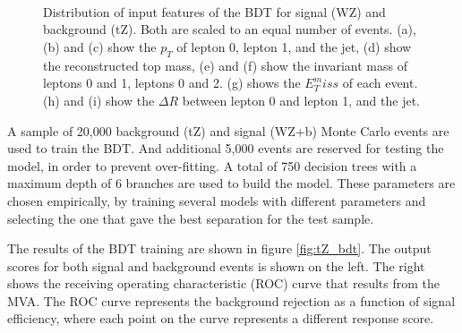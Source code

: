 \begin{figure}[H]
\center
    \\
    \\
    \\                          
    
    \caption{Distribution of input features of the BDT for signal (WZ) and background (tZ). Both are scaled to an equal number of events. (a), (b) and (c) show the $p_T$ of lepton 0, lepton 1, and the jet, (d) show the reconstructed top mass, (e) and (f) show the invariant mass of leptons 0 and 1, leptons 0 and 2. (g) shows the $E_T^miss$ of each event. (h) and (i) show the $\Delta R$ between lepton 0 and lepton 1, and the jet.}
    \label{fig:tZ_kinematics}
\end{figure}

A sample of 20,000 background (tZ) and signal (WZ+b) Monte Carlo events are used to train the BDT. And additional 5,000 events are reserved for testing the model, in order to prevent over-fitting. A total of 750 decision trees with a maximum depth of 6 branches are used to build the model. These parameters are chosen empirically, by training several models with different parameters and selecting the one that gave the best separation for the test sample. 

The results of the BDT training are shown in figure \ref{fig:tZ_bdt}. The output scores for both signal and background events is shown on the left. The right shows the receiving operating characteristic (ROC) curve that results from the MVA. The ROC curve represents the background rejection as a function of signal efficiency, where each point on the curve represents a different response score.

